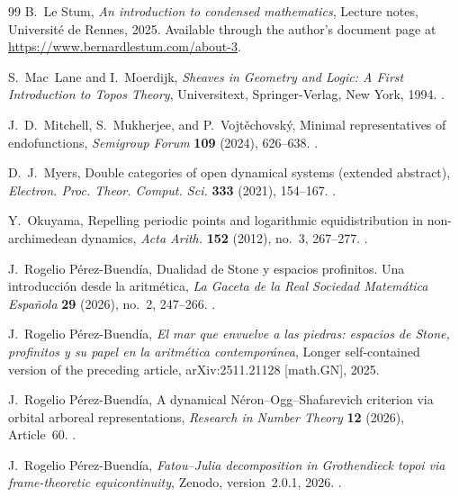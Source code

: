 \documentclass[10pt]{amsart}
\theoremstyle{plain}
\theoremstyle{definition}
\begin{document}
\begin{thebibliography}{99}
B.~Le Stum,
\newblock \emph{An introduction to condensed mathematics},
\newblock Lecture notes, Universit\'e de Rennes, 2025.
\newblock Available through the author's document page at
\url{https://www.bernardlestum.com/about-3}.

S.~Mac~Lane and I.~Moerdijk,
\newblock \emph{Sheaves in Geometry and Logic: A First Introduction to Topos Theory},
\newblock Universitext, Springer-Verlag, New York, 1994.
\newblock {}.

J.~D.~Mitchell, S.~Mukherjee, and P.~Vojt\v{e}chovsk\'y,
\newblock Minimal representatives of endofunctions,
\newblock \emph{Semigroup Forum} \textbf{109} (2024), 626--638.
\newblock {}.

D.~J.~Myers,
\newblock Double categories of open dynamical systems (extended abstract),
\newblock \emph{Electron. Proc. Theor. Comput. Sci.} \textbf{333} (2021),
154--167.
\newblock {}.

Y.~Okuyama,
\newblock Repelling periodic points and logarithmic equidistribution in
non-archimedean dynamics,
\newblock \emph{Acta Arith.} \textbf{152} (2012), no.~3, 267--277.
\newblock {}.

J.~Rogelio P\'erez-Buend\'ia,
\newblock Dualidad de {Stone} y espacios profinitos. Una introducci\'on desde la aritm\'etica,
\newblock \emph{La Gaceta de la Real Sociedad Matem\'atica Espa\~nola}
\textbf{29} (2026), no.~2, 247--266.
\newblock {}.

J.~Rogelio P\'erez-Buend\'ia,
\newblock \emph{El mar que envuelve a las piedras: espacios de {Stone},
profinitos y su papel en la aritm\'etica contempor\'anea},
\newblock Longer self-contained version of the preceding article,
arXiv:2511.21128 [math.GN], 2025.

J.~Rogelio P\'erez-Buend\'ia,
\newblock A dynamical {N\'eron--Ogg--Shafarevich} criterion via orbital arboreal representations,
\newblock \emph{Research in Number Theory} \textbf{12} (2026), Article~60.
\newblock {}.

J.~Rogelio P\'erez-Buend\'ia,
\newblock \emph{Fatou--{Julia} decomposition in {Grothendieck} topoi via
frame-theoretic equicontinuity},
\newblock Zenodo, version~2.0.1, 2026.
.


\end{thebibliography}
\end{document}
